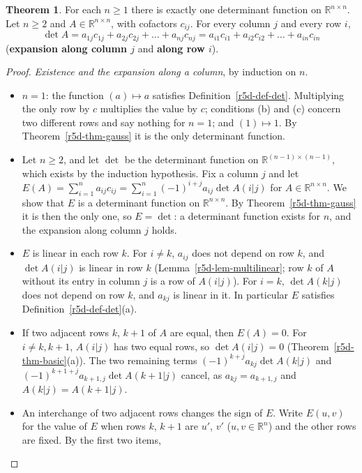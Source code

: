 \documentclass[12pt]{article}
\newcommand{\R}{\mathbb R}
\theoremstyle{definition}
\newtheorem{theorem}{Theorem}
\begin{document}
\begin{theorem}\label{r5d-thm-expansion}
For each \(n\geqslant1\) there is exactly one determinant function on \(\R^{n\times n}\). Let \(n\geqslant2\) and
\(A\in\R^{n\times n}\), with cofactors \(c_{ij}\). For every column \(j\) and every row \(i\),
\[
\det A=a_{1j}c_{1j}+a_{2j}c_{2j}+\dots+a_{nj}c_{nj}=a_{i1}c_{i1}+a_{i2}c_{i2}+\dots+a_{in}c_{in}
\]
(\textbf{expansion along column \(j\)} and \textbf{along row \(i\)}).
\end{theorem}
\begin{proof}
\textit{Existence and the expansion along a column}, by induction on \(n\).
\begin{itemize}
\item \(n=1\): the function \((a)\mapsto a\) satisfies Definition~\ref{r5d-def-det}. Multiplying the only row by \(c\)
multiplies the value by \(c\); conditions (b) and (c) concern two different rows and say nothing for \(n=1\); and
\((1)\mapsto1\). By Theorem~\ref{r5d-thm-gauss} it is the only determinant function.
\item Let \(n\geqslant2\), and let \(\det\) be the determinant function on \(\R^{(n-1)\times(n-1)}\), which exists by the
induction hypothesis. Fix a column \(j\) and let \(E(A)=\sum_{i=1}^na_{ij}c_{ij}=\sum_{i=1}^n(-1)^{i+j}a_{ij}\det A(i|j)\) for
\(A\in\R^{n\times n}\). We show that \(E\) is a determinant function on \(\R^{n\times n}\). By Theorem~\ref{r5d-thm-gauss} it
is then the only one, so \(E=\det\): a determinant function exists for \(n\), and the expansion along column \(j\) holds.
\item \(E\) is linear in each row \(k\). For \(i\ne k\), \(a_{ij}\) does not depend on row \(k\), and \(\det A(i|j)\) is
linear in row \(k\) (Lemma~\ref{r5d-lem-multilinear}; row \(k\) of \(A\) without its entry in column \(j\) is a row
of \(A(i|j)\)). For \(i=k\), \(\det A(k|j)\) does not depend on row \(k\), and \(a_{kj}\) is linear in it. In
particular \(E\) satisfies Definition~\ref{r5d-def-det}(a).
\item If two adjacent rows \(k\), \(k+1\) of \(A\) are equal, then \(E(A)=0\). For \(i\ne k,k+1\), \(A(i|j)\) has two
equal rows, so \(\det A(i|j)=0\) (Theorem~\ref{r5d-thm-basic}(a)). The two remaining terms
\((-1)^{k+j}a_{kj}\det A(k|j)\) and \((-1)^{k+1+j}a_{k+1,j}\det A(k+1|j)\) cancel, as \(a_{kj}=a_{k+1,j}\) and
\(A(k|j)=A(k+1|j)\).
\item An interchange of two adjacent rows changes the sign of \(E\). Write \(E(u,v)\) for the value of \(E\) when
rows \(k\), \(k+1\) are \(u'\), \(v'\) (\(u,v\in\R^n\)) and the other rows are fixed. By the first two items,

\end{itemize}
\end{proof}
\end{document}
